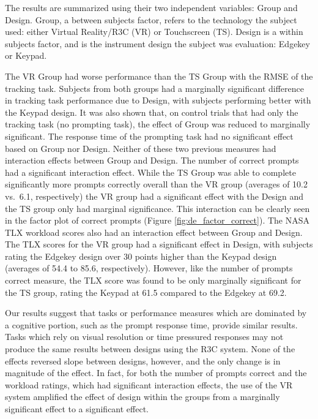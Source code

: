 The results are summarized using their two independent variables: Group and Design.
Group, a between subjects factor, refers to the technology the subject used: either Virtual Reality/R3C (VR) or Touchscreen (TS).
Design is a within subjects factor, and is the instrument design the subject was evaluation: Edgekey or Keypad.

The VR Group had worse performance than the TS Group with the RMSE of the tracking task.
Subjects from both groups had a marginally significant difference in tracking task performance due to Design, with subjects performing better with the Keypad design.
It was also shown that, on control trials that had only the tracking task (no prompting task), the effect of Group was reduced to marginally significant.
The response time of the prompting task had no significant effect based on Group nor Design.
Neither of these two previous measures had interaction effects between Group and Design.
The number of correct prompts had a significant interaction effect.
While the TS Group was able to complete significantly more prompts correctly overall than the VR group (averages of 10.2 vs.\ 6.1, respectively) the VR group had a significant effect with the Design and the TS group only had marginal significance.
This interaction can be clearly seen in the factor plot of correct prompts (Figure \ref{fig:de_factor_correct}).
The NASA TLX workload scores also had an interaction effect between Group and Design.
The TLX scores for the VR group had a significant effect in Design, with subjects rating the Edgekey design over 30 points higher than the Keypad design (averages of 54.4 to 85.6, respectively).
However, like the number of prompts correct measure, the TLX score was found to be only marginally significant for the TS group, rating the Keypad at 61.5 compared to the Edgekey at 69.2.


Our results suggest that tasks or performance measures which are dominated by a cognitive portion, such as the prompt response time, provide similar results.
Tasks which rely on visual resolution or time pressured responses may not produce the same results between designs using the R3C system.
None of the effects reversed slope between designs, however, and the only change is in magnitude of the effect.
In fact, for both the number of prompts correct and the workload ratings, which had significant interaction effects, the use of the VR system amplified the effect of design within the groups from a marginally significant effect to a significant effect.

